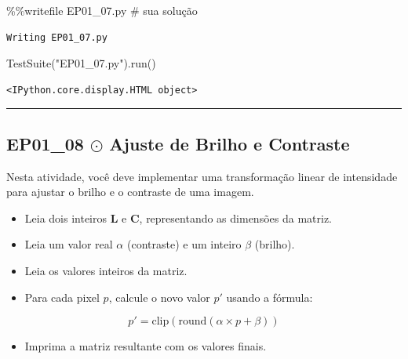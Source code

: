 \documentclass[
  portuguese,
  letterpaper,
  openany,
  oneside,
  12pt,
  a4paper]{book}
\newenvironment{Shaded}{\begin{snugshade}}{\end{snugshade}}
\newcommand{\CommentTok}[1]{\textcolor[rgb]{0.37,0.37,0.37}{#1}}
\newcommand{\NormalTok}[1]{\textcolor[rgb]{0.00,0.23,0.31}{#1}}
\newcommand{\OperatorTok}[1]{\textcolor[rgb]{0.37,0.37,0.37}{#1}}
\newcommand{\StringTok}[1]{\textcolor[rgb]{0.13,0.47,0.30}{#1}}
\providecommand{\tightlist}{%
  \setlength{\itemsep}{0pt}\setlength{\parskip}{0pt}}
\begin{document}
\begin{Shaded}
\begin{Highlighting}[]
\OperatorTok{\%\%}\NormalTok{writefile EP01\_07.py}
\CommentTok{\# sua solução}
\end{Highlighting}
\end{Shaded}

\begin{verbatim}
Writing EP01_07.py
\end{verbatim}

\begin{Shaded}
\begin{Highlighting}[]
\NormalTok{TestSuite(}\StringTok{"EP01\_07.py"}\NormalTok{).run()}
\end{Highlighting}
\end{Shaded}

\begin{verbatim}
<IPython.core.display.HTML object>
\end{verbatim}

\begin{center}\rule{0.5\linewidth}{0.5pt}\end{center}

\subsection{\texorpdfstring{EP01\_08 $\odot$ Ajuste de Brilho e
Contraste}{EP01\_08  Ajuste de Brilho e Contraste}}\label{ep01_08-ajuste-de-brilho-e-contraste}

Nesta atividade, você deve implementar uma transformação linear de
intensidade para ajustar o brilho e o contraste de uma imagem.

\begin{itemize}
\tightlist
\item
  Leia dois inteiros \textbf{L} e \textbf{C}, representando as dimensões
  da matriz.
\item
  Leia um valor real \textbf{\(\alpha\)} (contraste) e um inteiro
  \textbf{\(\beta\)} (brilho).
\item
  Leia os valores inteiros da matriz.
\item
  Para cada pixel \(p\), calcule o novo valor \(p'\) usando a fórmula:
\end{itemize}

\[p' = \text{clip}(\text{round}(\alpha \times p + \beta))\]

\begin{itemize}
\tightlist
\item
  Imprima a matriz resultante com os valores finais.
\end{itemize}
\end{document}

